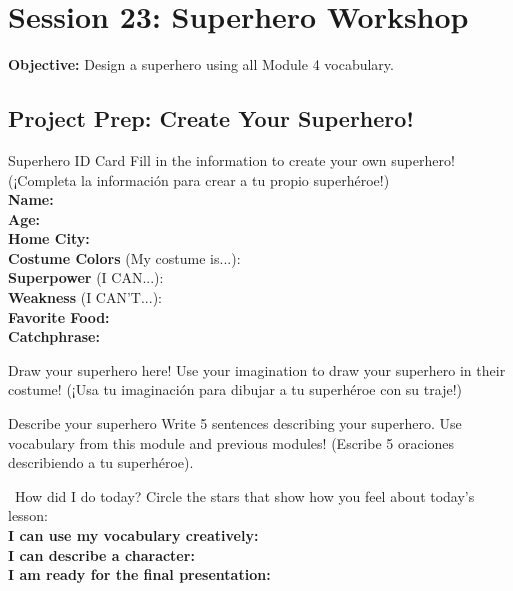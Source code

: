 \section*{Session 23: Superhero Workshop}
\textbf{Objective:} Design a superhero using all Module 4 vocabulary.

\subsection*{Project Prep: Create Your Superhero!}

\begin{activity}{Superhero ID Card}
  Fill in the information to create your own superhero! (¡Completa la información para crear a tu propio superhéroe!)\\
  
  \textbf{Name:} \answerline[6cm] \\
  \textbf{Age:} \answerline[6cm] \\
  \textbf{Home City:} \answerline[6cm] \\
  \textbf{Costume Colors} (My costume is...): \answerline[6cm] \\
  \textbf{Superpower} (I CAN...): \answerline[6cm] \\
  \textbf{Weakness} (I CAN'T...): \answerline[6cm] \\
  \textbf{Favorite Food:} \answerline[6cm] \\
  \textbf{Catchphrase:} \answerline[6cm]
\end{activity}

\begin{activity}{Draw your superhero here! }
  Use your imagination to draw your superhero in their costume! (¡Usa tu imaginación para dibujar a tu superhéroe con su traje!)
  \vspace{6cm} %
\end{activity}

\begin{activity}{Describe your superhero}
  Write 5 sentences describing your superhero. Use vocabulary from this module and previous modules! (Escribe 5 oraciones describiendo a tu superhéroe).
  \writinglines[5]
\end{activity}

\vspace{1em}
\begin{grammartip}{ \ How did I do today?}
  Circle the stars that show how you feel about today's lesson:\\[6pt]
  \textbf{I can use my vocabulary creatively:} \selfcheck[0] \\[4pt]
  \textbf{I can describe a character:} \selfcheck[0] \\[4pt]
  \textbf{I am ready for the final presentation:} \selfcheck[0]
\end{grammartip}
